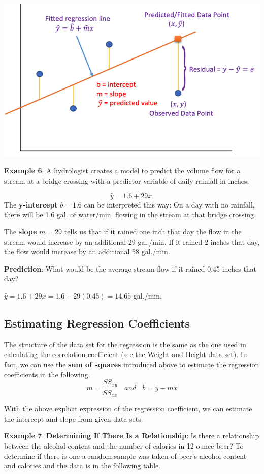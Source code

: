 \documentclass[
]{book}
\begin{document}
\begin{center}\includegraphics[width=0.5\linewidth]{week12/linearRegStructure} \end{center}

\textbf{Example 6}. A hydrologist creates a model to predict the volume flow for a stream at a bridge crossing with a predictor variable of daily rainfall in inches.

\[
\hat{y} = 1.6 + 29x.
\]
The \textbf{y-intercept} \(b = 1.6\) can be interpreted this way: On a day with no rainfall, there will be 1.6 gal. of water/min. flowing in the stream at that bridge crossing.

The \textbf{slope} \(m = 29\) tells us that if it rained one inch that day the flow in the stream would increase by an additional 29 gal./min. If it rained 2 inches that day, the flow would increase by an additional 58 gal./min.

\textbf{Prediction}: What would be the average stream flow if it rained 0.45 inches that day?

\(\hat{y} = 1.6 + 29x = 1.6 + 29(0.45) =14.65\) gal./min.

\hypertarget{estimating-regression-coefficients}{%
\subsection{Estimating Regression Coefficients}\label{estimating-regression-coefficients}}

The structure of the data set for the regression is the same as the one used in calculating the correlation coefficient (see the Weight and Height data set). In fact, we can use the \textbf{sum of squares} introduced above to estimate the regression coefficients in the following.
\[
m = \frac{SS_{xy}}{SS_{xx}}  \ \ \ \  and \ \ \ \ b = \bar{y} - m \bar{x}
\]

With the above explicit expression of the regression coefficient, we can estimate the intercept and slope from given data sets.

\textbf{Example 7}. \textbf{Determining If There Is a Relationship}: Is there a relationship between the alcohol content and the number of calories in 12-ounce beer? To determine if there is one a random sample was taken of beer's alcohol content and calories and the data is in the following table.
\end{document}
